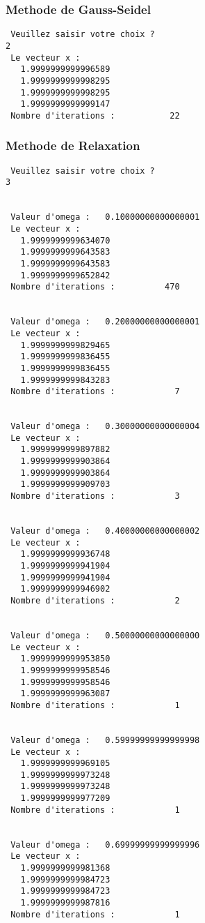 \documentclass{report}
\begin{document}
\subsubsection{Methode de Gauss-Seidel}
\begin{small}
\begin{verbatim}
 Veuillez saisir votre choix ?
2
 Le vecteur x :
   1.9999999999996589
   1.9999999999998295
   1.9999999999998295
   1.9999999999999147
 Nombre d'iterations :           22
\end{verbatim}

\subsubsection{Methode de Relaxation}
\begin{verbatim}
 Veuillez saisir votre choix ?
3


 Valeur d'omega :   0.10000000000000001     
 Le vecteur x :
   1.9999999999634070     
   1.9999999999643583     
   1.9999999999643583     
   1.9999999999652842     
 Nombre d'iterations :          470


 Valeur d'omega :   0.20000000000000001     
 Le vecteur x :
   1.9999999999829465     
   1.9999999999836455     
   1.9999999999836455     
   1.9999999999843283     
 Nombre d'iterations :            7


 Valeur d'omega :   0.30000000000000004     
 Le vecteur x :
   1.9999999999897882     
   1.9999999999903864     
   1.9999999999903864     
   1.9999999999909703     
 Nombre d'iterations :            3


 Valeur d'omega :   0.40000000000000002     
 Le vecteur x :
   1.9999999999936748     
   1.9999999999941904     
   1.9999999999941904     
   1.9999999999946902     
 Nombre d'iterations :            2


 Valeur d'omega :   0.50000000000000000     
 Le vecteur x :
   1.9999999999953850     
   1.9999999999958546     
   1.9999999999958546     
   1.9999999999963087     
 Nombre d'iterations :            1


 Valeur d'omega :   0.59999999999999998     
 Le vecteur x :
   1.9999999999969105     
   1.9999999999973248     
   1.9999999999973248     
   1.9999999999977209     
 Nombre d'iterations :            1


 Valeur d'omega :   0.69999999999999996     
 Le vecteur x :
   1.9999999999981368     
   1.9999999999984723     
   1.9999999999984723     
   1.9999999999987816     
 Nombre d'iterations :            1



\end{verbatim}
\end{small}
\end{document}
